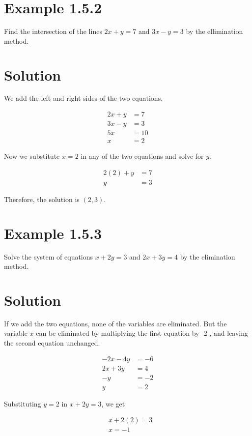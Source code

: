 \section*{Example 1.5.2}
Find the intersection of the lines $2 x+y=7$ and $3 x-y=3$ by the ellimination method.

\section*{Solution}
We add the left and right sides of the two equations.

$$
\begin{aligned}
2 x+y & =7 \\
3 x-y & =3 \\
\hline 5 x & =10 \\
x & =2
\end{aligned}
$$

Now we substitute $x=2$ in any of the two equations and solve for $y$.

$$
\begin{aligned}
2(2)+y & =7 \\
y & =3
\end{aligned}
$$

Therefore, the solution is $(2,3)$.

\section*{Example 1.5.3}
Solve the system of equations $x+2 y=3$ and $2 x+3 y=4$ by the elimination method.

\section*{Solution}
If we add the two equations, none of the variables are eliminated. But the variable $x$ can be eliminated by multiplying the first equation by -2 , and leaving the second equation unchanged.

$$
\begin{aligned}
-2 x-4 y & =-6 \\
2 x+3 y & =4 \\
\hline-y & =-2 \\
y & =2
\end{aligned}
$$

Substituting $y=2$ in $x+2 y=3$, we get


\begin{align*}
& x+2(2)=3  \tag{1.5.1}\\
& x=-1
\end{align*}


